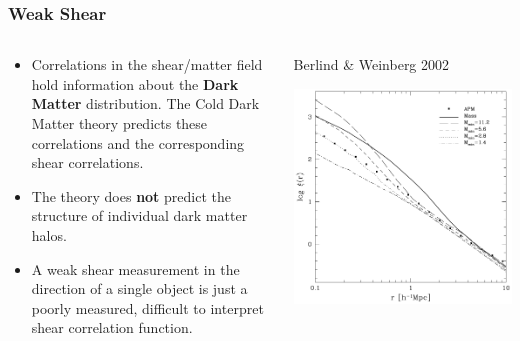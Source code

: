 \documentclass{beamer}
\begin{document}
{
    \frametitle{Weak Shear}
    \fontsize{9}{0.8\baselineskip}

    \begin{columns}
        \begin{column}{0.5\textwidth}
            \begin{itemize}

                \item Correlations in the shear/matter field hold information
                    about the {\bf Dark Matter} distribution.  The Cold Dark
                    Matter theory predicts these correlations and the
                    corresponding shear correlations.

                \item The theory does {\bf not} predict the structure of
                    individual dark matter halos.  

                \item A weak shear measurement in the direction of a single
                    object is just a poorly measured, difficult to interpret
                    shear correlation function.

            \end{itemize}
        \end{column}

        \begin{column}{0.5\textwidth}
            \begin{center}
                {\tiny Berlind \& Weinberg 2002}
            \end{center}
            \includegraphics[width=\textwidth]{berlind-weinberg-f3-crop.pdf}
            \newline
        \end{column}
    \end{columns}
}
\end{document}
